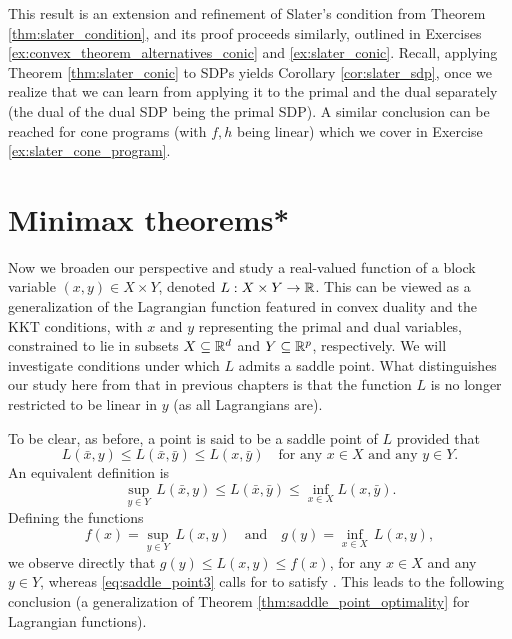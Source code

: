This result is an extension and refinement of Slater's condition from Theorem 
\ref{thm:slater_condition}, and its proof proceeds similarly, outlined in
Exercises \ref{ex:convex_theorem_alternatives_conic} and \ref{ex:slater_conic}.  
Recall, applying Theorem \ref{thm:slater_conic} to SDPs yields Corollary 
\ref{cor:slater_sdp}, once we realize that we can learn from applying it to the
primal and the dual separately (the dual of the dual SDP being the primal SDP). 
A similar conclusion can be reached for cone programs (with $f,h$ being linear)
which we cover in Exercise \ref{ex:slater_cone_program}.

\section{Minimax theorems*}
\label{sec:minimax_theorems}

Now we broaden our perspective and study a real-valued function of a block
variable $(x,y) \in X \times Y$, denoted $L : X \times Y \to \mathbb{R}$. This can be
viewed as a generalization of the Lagrangian function featured in convex duality 
and the KKT conditions, with $x$ and $y$ representing the primal and dual
variables, constrained to lie in subsets $X \subseteq \mathbb{R}^d$ and $Y \subseteq  
\mathbb{R}^p$, respectively. We will investigate conditions under which $L$ admits a 
saddle point. What distinguishes our study here from that in previous chapters
is that the function $L$ is no longer restricted to be linear in $y$ (as all
Lagrangians are).     

To be clear, as before, a point  is
said to be a saddle point of $L$ provided that  
\begin{equation}
\label{eq:saddle_point2}
L(\bar{x}, y) \leq L(\bar{x}, \bar{y}) \leq L(x, \bar{y}) \quad \text{for any
  $x \in X$ and any $y \in Y$}. 
\end{equation}
An equivalent definition is 
\begin{equation}
\label{eq:saddle_point3}
\sup_{y \in Y} \, L(\bar{x}, y) \leq L(\bar{x}, \bar{y}) \leq \inf_{x \in X}
L(x, \bar{y}). 
\end{equation}
Defining the functions
\begin{equation}
\label{eq:saddle_functions}
f(x) = \sup_{y \in Y} \, L(x,y) \quad \text{and} \quad 
g(y) = \inf_{x \in X} \, L(x,y),
\end{equation}
we observe directly that $g(y) \leq L(x,y) \leq f(x)$, for any $x \in X$ and any 
$y \in Y$, whereas \eqref{eq:saddle_point3} calls for  to satisfy . This leads to the following conclusion (a generalization of
Theorem \ref{thm:saddle_point_optimality} for Lagrangian functions). 

